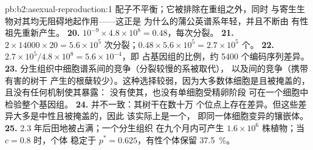 \begin{solution}{pb:b2:asexual-reproduction:1}
配子不平衡；它被排除在重组之外，同时
与寄生生物对其均无阻碍地起作用——这正是
为什么的蒲公英谱系年轻，并且不断由
有性祖先重新产生。
\textbf{20.} $10^{-9}\times 4.8\times 10^{8} = 0.48$，每次分裂。
\textbf{21.} $2\times \num{14000}\times 20 = 5.6\times 10^{5}$
次分裂；$0.48\times 5.6\times 10^{5} = 2.7\times 10^{5}$
个。
\textbf{22.} $2.7\times 10^{5}/4.8\times 10^{8} = 5.6\times 10^{-4}$，即
占基因组的比例，约 \num{5400} 个编码序列差异。
\textbf{23.} 分生组织中细胞谱系间的竞争（分裂较慢的系被取代），
以及间的竞争（携带有害的树干
产生的根蘖较少）。这种选择较弱，因为大多数体细胞是且被掩盖的，
且没有任何机制使其暴露：
没有使其，也没有单细胞受精卵阶段
可在一个细胞中检验整个基因组。
\textbf{24.} 并不一致：其树干在数十万
个位点上存在差异。但这些差异大多是中性且被掩盖的，因此
该实际上是一个，
即同一体细胞变异的镶嵌体。
\textbf{25.} 2.3 年后田地被占满；一个分生组织
在九个月内可产生 $1.6\times 10^{6}$ 株植物；当 $c = 0.8$ 时，个体
稳定于 $p^* = 0.625$，有性个体保留 \qty{37.5}{\%}。
\end{solution}
